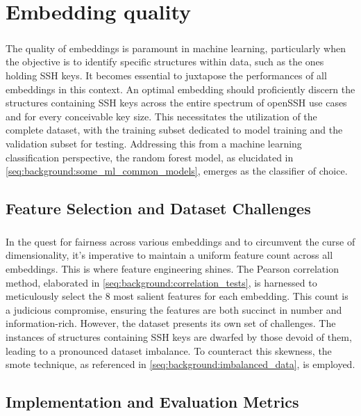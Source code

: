 \chapter{Embedding quality}\label{chap:embedding_quality}

\paragraph{}The quality of embeddings is paramount in machine learning, particularly when the objective is to identify specific \glspl{structure} within data, such as the ones holding SSH keys. It becomes essential to juxtapose the performances of all embeddings in this context. An optimal embedding should proficiently discern the \glspl{structure} containing SSH keys across the entire spectrum of openSSH use cases and for every conceivable key size. This necessitates the utilization of the complete dataset, with the training subset dedicated to model training and the validation subset for testing. Addressing this from a machine learning classification perspective, the random forest model, as elucidated in \ref{seq:background:some_ml_common_models}, emerges as the classifier of choice.

\section{Feature Selection and Dataset Challenges}

\paragraph{}In the quest for fairness across various embeddings and to circumvent the curse of dimensionality, it's imperative to maintain a uniform feature count across all embeddings. This is where feature engineering shines. The Pearson correlation method, elaborated in \ref{seq:background:correlation_tests}, is harnessed to meticulously select the 8 most salient features for each embedding. This count is a judicious compromise, ensuring the features are both succinct in number and information-rich. However, the dataset presents its own set of challenges. The instances of \glspl{structure} containing SSH keys are dwarfed by those devoid of them, leading to a pronounced dataset imbalance. To counteract this skewness, the \gls{smote} technique, as referenced in \ref{seq:background:imbalanced_data}, is employed.

\section{Implementation and Evaluation Metrics}


